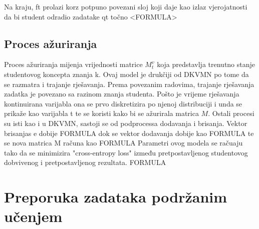 \documentclass[times, utf8,projekt]{fer}
\begin{document}
Na kraju, ft prolazi korz potpuno povezani sloj koji daje kao izlaz vjerojatnosti da bi student odradio
zadatake qt točno <FORMULA>

\subsection{Proces ažuriranja}

Proces ažuriranja mijenja vrijednosti matrice $M^v_t$ koja predstavlja trenutno stanje studentovog koncepta znanja k.
Ovaj model je drukčiji od DKVMN po tome da se razmatra i trajanje rješavanja. Prema povezanim radovima, trajanje rješavanja zadatka je povezano sa razinom znanja studenta. Pošto je vrijeme rješavanja kontinuirana varijabla ona se prvo diskretizira po njenoj distribuciji i unda se prikaže kao varijabla t te se koristi kako bi se ažurirala matrica $M$. Ostali procesi su isti kao i u DKVMN, sastoji se od podprocessa dodavanja i brisanja. Vektor brisanjas e dobije FORMULA dok se vektor dodavanja dobije kao FORMULA te se nova matrica M računa kao FORMULA
Parametri ovog modela se račuaju tako da se minimizira "cross-entropy loss" između pretpostavljenog studentovog
dobvivenog i pretpostavljenog rezultata. FORMULA





\section{Preporuka zadataka podržanim učenjem}
\end{document}
